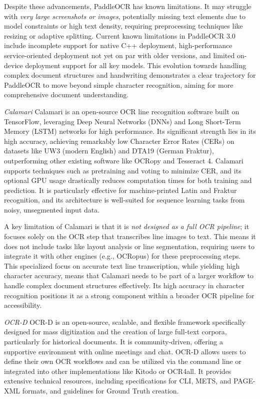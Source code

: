 Despite these advancements, PaddleOCR has known limitations. It may struggle with \emph{very large screenshots or images}, potentially missing text elements due to model constraints or high text density, requiring preprocessing techniques like resizing or adaptive splitting. \cite{GithubPaddleOCR} Current known limitations in PaddleOCR 3.0 include incomplete support for native C++ deployment, high-performance service-oriented deployment not yet on par with older versions, and limited on-device deployment support for all key models. \cite{PaddleOCR} This evolution towards handling complex document structures and handwriting demonstrates a clear trajectory for PaddleOCR to move beyond simple character recognition, aiming for more comprehensive document understanding.

\emph{Calamari}
Calamari is an open-source OCR line recognition software built on TensorFlow, leveraging Deep Neural Networks (DNNs) and Long Short-Term Memory (LSTM) networks for high performance. \cite{CalamariRG,JLCLCalamari,SourceOpenNewsOCR} Its significant strength lies in its high accuracy, achieving remarkably low Character Error Rates (CERs) on datasets like UW3 (modern English) and DTA19 (German Fraktur), outperforming other existing software like OCRopy and Tesseract 4. \cite{CalamariRG,JLCLCalamari} Calamari supports techniques such as pretraining and voting to minimize CER, and its optional GPU usage drastically reduces computation times for both training and prediction. \cite{CalamariRG,JLCLCalamari,ArxivCalamari} It is particularly effective for machine-printed Latin and Fraktur recognition, and its architecture is well-suited for sequence learning tasks from noisy, unsegmented input data. \cite{CalamariRG}

A key limitation of Calamari is that it is \emph{not designed as a full OCR pipeline}; it focuses solely on the OCR step that transcribes line images to text. \cite{ArxivCalamari} This means it does not include tasks like layout analysis or line segmentation, requiring users to integrate it with other engines (e.g., OCRopus) for these preprocessing steps. \cite{ArxivCalamari,SourceOpenNewsOCR} This specialized focus on accurate text line transcription, while yielding high character accuracy, means that Calamari needs to be part of a larger workflow to handle complex document structures effectively. Its high accuracy in character recognition positions it as a strong component within a broader OCR pipeline for accessibility.

\emph{OCR-D}
OCR-D is an open-source, scalable, and flexible framework specifically designed for mass digitization and the creation of large full-text corpora, particularly for historical documents. \cite{OCRD} It is community-driven, offering a supportive environment with online meetings and chat. \cite{OCRD} OCR-D allows users to define their own OCR workflows and can be utilized via the command line or integrated into other implementations like Kitodo or OCR4all. \cite{OCRD} It provides extensive technical resources, including specifications for CLI, METS, and PAGE-XML formats, and guidelines for Ground Truth creation. \cite{OCRD}

